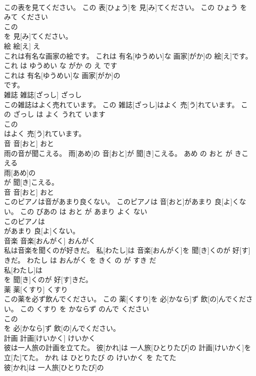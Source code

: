 \documentclass[8pt]{extreport}
\begin{document}
\begin{CJK}{UTF8}{min}
\\	この表を見てください。	この 表[ひょう]を 見[み]てください。	この ひょう を みて ください	
\\	この
\\	を 見[み]てください。			
\\	絵	絵[え]	え	
\\	これは有名な画家の絵です。	これは 有名[ゆうめい]な 画家[がか]の 絵[え]です。	これ は ゆうめい な がか の え です	
\\	これは 有名[ゆうめい]な 画家[がか]の
\\	です。			
\\	雑誌	雑誌[ざっし]	ざっし	
\\	この雑誌はよく売れています。	この 雑誌[ざっし]はよく 売[う]れています。	この ざっし は よく うれて います	
\\	この
\\	はよく 売[う]れています。			
\\	音	音[おと]	おと	
\\	雨の音が聞こえる。	雨[あめ]の 音[おと]が 聞[き]こえる。	あめ の おと が きこえる	
\\	雨[あめ]の
\\	が 聞[き]こえる。			
\\	音	音[おと]	おと	
\\	このピアノは音があまり良くない。	このピアノは 音[おと]があまり 良[よ]くない。	この ぴあの は おと が あまり よく ない	
\\	このピアノは
\\	があまり 良[よ]くない。			
\\	音楽	音楽[おんがく]	おんがく	
\\	私は音楽を聞くのが好きだ。	私[わたし]は 音楽[おんがく]を 聞[き]くのが 好[す]きだ。	わたし は おんがく を きく の が すき だ	
\\	私[わたし]は
\\	を 聞[き]くのが 好[す]きだ。			
\\	薬	薬[くすり]	くすり	
\\	この薬を必ず飲んでください。	この 薬[くすり]を 必[かなら]ず 飲[の]んでください。	この くすり を かならず のんで ください	
\\	この
\\	を 必[かなら]ず 飲[の]んでください。			
\\	計画	計画[けいかく]	けいかく	
\\	彼は一人旅の計画を立てた。	彼[かれ]は 一人旅[ひとりたび]の 計画[けいかく]を 立[た]てた。	かれ は ひとりたび の けいかく を たてた	
\\	彼[かれ]は 一人旅[ひとりたび]の

\end{CJK}
\end{document}
